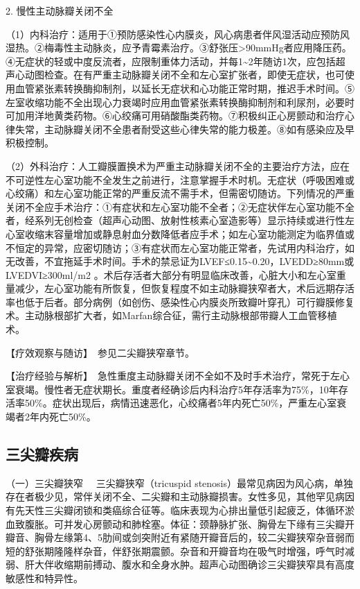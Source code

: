 2. 慢性主动脉瓣关闭不全

（1）内科治疗：适用于①预防感染性心内膜炎，风心病患者伴风湿活动应预防风湿热。②梅毒性主动脉炎，应予青霉素治疗。③舒张压\textgreater{}90mmHg者应用降压药。④无症状的轻或中度反流者，应限制重体力活动，并每1\textasciitilde{}2年随访1次，应包括超声心动图检查。在有严重主动脉瓣关闭不全和左心室扩张者，即使无症状，也可使用血管紧张素转换酶抑制剂，以延长无症状和心功能正常时期，推迟手术时间。⑤左室收缩功能不全出现心力衰竭时应用血管紧张素转换酶抑制剂和利尿剂，必要时可加用洋地黄类药物。⑥心绞痛可用硝酸酯类药物。⑦积极纠正心房颤动和治疗心律失常，主动脉瓣关闭不全患者耐受这些心律失常的能力极差。⑧如有感染应及早积极控制。

（2）外科治疗：人工瓣膜置换术为严重主动脉瓣关闭不全的主要治疗方法，应在不可逆性左心室功能不全发生之前进行，注意掌握手术时机。无症状（呼吸困难或心绞痛）和左心室功能正常的严重反流不需手术，但需密切随访。下列情况的严重关闭不全应手术治疗：①有症状和左心室功能不全者；②无症状伴左心室功能不全者，经系列无创检查（超声心动图、放射性核素心室造影等）显示持续或进行性左心室收缩末容量增加或静息射血分数降低者应手术；如左心室功能测定为临界值或不恒定的异常，应密切随访；③有症状而左心室功能正常者，先试用内科治疗，如无改善，不宜拖延手术时间。手术的禁忌证为LVEF≤0.15\textasciitilde{}0.20，LVEDD≥80mm或LVEDVI≥300ml/m{2}
。术后存活者大部分有明显临床改善，心脏大小和左心室重量减少，左心室功能有所恢复，但恢复程度不如主动脉瓣狭窄者大，术后远期存活率也低于后者。部分病例（如创伤、感染性心内膜炎所致瓣叶穿孔）可行瓣膜修复术。主动脉根部扩大者，如Marfan综合征，需行主动脉根部带瓣人工血管移植术。

【疗效观察与随访】　参见二尖瓣狭窄章节。

【治疗经验与解析】　急性重度主动脉瓣关闭不全如不及时手术治疗，常死于左心室衰竭。慢性者无症状期长。重度者经确诊后内科治疗5年存活率为75\%，10年存活率50\%。症状出现后，病情迅速恶化，心绞痛者5年内死亡50\%，严重左心室衰竭者2年内死亡50\%。

\subsection{三尖瓣疾病}

{（一）三尖瓣狭窄} 　三尖瓣狭窄（tricuspid
stenosis）最常见病因为风心病，单独存在者极少见，常伴关闭不全、二尖瓣和主动脉瓣损害。女性多见，其他罕见病因有先天性三尖瓣闭锁和类癌综合征等。临床表现为心排出量低引起疲乏，体循环淤血致腹胀。可并发心房颤动和肺栓塞。体征：颈静脉扩张、胸骨左下缘有三尖瓣开瓣音、胸骨左缘第4、5肋间或剑突附近有紧随开瓣音后的，较二尖瓣狭窄杂音弱而短的舒张期隆隆样杂音，伴舒张期震颤。杂音和开瓣音均在吸气时增强，呼气时减弱、肝大伴收缩期前搏动、腹水和全身水肿。超声心动图确诊三尖瓣狭窄具有高度敏感性和特异性。

